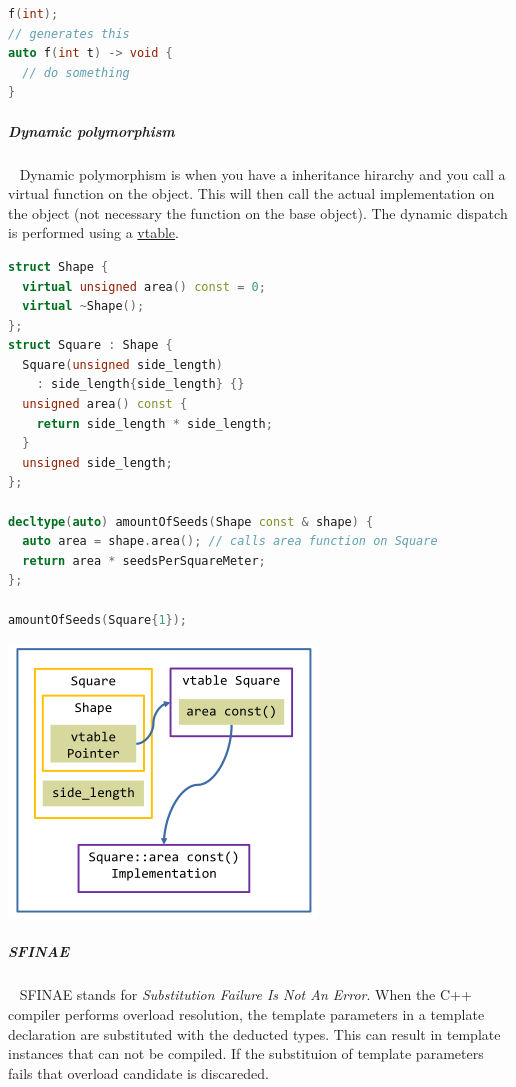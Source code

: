 \documentclass[11pt,twoside,landscape]{article}
\begin{document}
\begin{multicols}{2}
\begin{lstlisting}[language=c++,label=lst:org5b4253b,caption={Example for a C++ template},captionpos=b,numbers=none]
f(int);
// generates this
auto f(int t) -> void {
  // do something
}
\end{lstlisting}

\subparagraph{Dynamic polymorphism} \
\label{sec:org159311c}
Dynamic polymorphism is when you have a inheritance hirarchy and you call a virtual function on the object.
This will then call the actual implementation on the object (not necessary the function on the base object).
The dynamic dispatch is performed using a \href{../../../roam/20221230181314-what_is_the_virtual_method_table.org}{vtable}.

\begin{lstlisting}[language=c++,numbers=none]
struct Shape {
  virtual unsigned area() const = 0;
  virtual ~Shape();
};
struct Square : Shape {
  Square(unsigned side_length)
    : side_length{side_length} {}
  unsigned area() const {
    return side_length * side_length;
  }
  unsigned side_length;
};

decltype(auto) amountOfSeeds(Shape const & shape) {
  auto area = shape.area(); // calls area function on Square
  return area * seedsPerSquareMeter;
};

amountOfSeeds(Square{1});
\end{lstlisting}


{
\begin{center}
\includegraphics[width=.9\linewidth]{img/dynamic_dispatch.png}
\end{center}
\label{fig:dynamic-dispatch}
}
\subparagraph{SFINAE} \
\label{sec:orgd2b204a}
SFINAE stands for \emph{Substitution Failure Is Not An Error}.
When the C++ compiler performs overload resolution, the template parameters in a template declaration are substituted with the deducted types.
This can result in template instances that can not be compiled.
If the substituion of template parameters fails that overload candidate is discareded.


\end{multicols}
\end{document}
